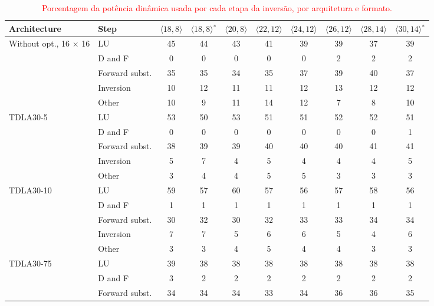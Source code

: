 \begin{table}[htbp]
\caption{\textcolor{red}{Porcentagem da potência dinâmica usada por cada etapa da inversão, por arquitetura e formato.}}
\label{tab:etapas-potencia}
\vspace{4pt} %
\centering
\scriptsize
\color{red}
\renewcommand{\arraystretch}{1.05}
\setlength{\tabcolsep}{3pt}
\begin{tabular}{llcccccccc}
\toprule
\textbf{Architecture} & \textbf{Step} & \textbf{$\langle 18,8\rangle$} & \textbf{$\langle 18,8\rangle$$^{*}$} & \textbf{$\langle 20,8\rangle$} & \textbf{$\langle 22,12\rangle$} & \textbf{$\langle 24,12\rangle$} & \textbf{$\langle 26,12\rangle$} & \textbf{$\langle 28,14\rangle$} & \textbf{$\langle 30,14\rangle$$^{*}$} \\
\midrule
\multirow{5}{*}{Without opt., 16 $\times$ 16} & LU & 45 & 44 & 43 & 41 & 39 & 39 & 37 & 39 \\
 & D and F & 0 & 0 & 0 & 0 & 0 & 2 & 2 & 2 \\
 & Forward subst. & 35 & 35 & 34 & 35 & 37 & 39 & 40 & 37 \\
 & Inversion & 10 & 12 & 11 & 11 & 12 & 13 & 12 & 12 \\
 & Other & 10 & 9 & 11 & 14 & 12 & 7 & 8 & 10 \\
\midrule
\multirow{5}{*}{TDLA30-5} & LU & 53 & 50 & 53 & 51 & 51 & 52 & 52 & 51 \\
 & D and F & 0 & 0 & 0 & 0 & 0 & 0 & 0 & 1 \\
 & Forward subst. & 38 & 39 & 39 & 40 & 40 & 40 & 41 & 41 \\
 & Inversion & 5 & 7 & 4 & 5 & 4 & 4 & 4 & 5 \\
 & Other & 3 & 4 & 4 & 5 & 5 & 3 & 3 & 3 \\
\midrule
\multirow{5}{*}{TDLA30-10} & LU & 59 & 57 & 60 & 57 & 56 & 57 & 58 & 56 \\
 & D and F & 1 & 1 & 1 & 1 & 1 & 1 & 1 & 1 \\
 & Forward subst. & 30 & 32 & 30 & 32 & 33 & 33 & 34 & 34 \\
 & Inversion & 7 & 7 & 5 & 6 & 6 & 5 & 4 & 6 \\
 & Other & 3 & 3 & 4 & 5 & 4 & 4 & 3 & 3 \\
\midrule
\multirow{5}{*}{TDLA30-75} & LU & 39 & 38 & 38 & 38 & 38 & 38 & 38 & 38 \\
 & D and F & 3 & 2 & 2 & 2 & 2 & 2 & 2 & 2 \\
 & Forward subst. & 34 & 34 & 34 & 33 & 34 & 36 & 36 & 35 \\

\end{tabular}
\end{table}
